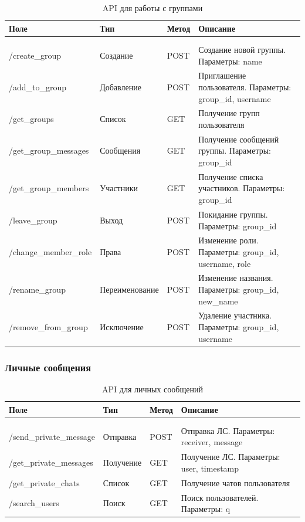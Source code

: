 \begin{xltabular}{\textwidth}{|l|l|p{1.7cm}|X|}
	\caption{API для работы с группами}\label{tab:groups_api} \\ \hline
	\centrow Поле & \centrow Тип & \centrow Метод & \centrow Описание \\ \hline
	 &  &  &  \\ \hline
	\endfirsthead
	 &  &  &  \\ \hline
	\finishhead
	/create\_group & Создание & POST & Создание новой группы. Параметры: name \\ \hline 
	/add\_to\_group & Добавление & POST & Приглашение пользователя. Параметры: group\_id, username \\ \hline 
	/get\_groups & Список & GET & Получение групп пользователя \\ \hline 
	/get\_group\_messages & Сообщения & GET & Получение сообщений группы. Параметры: group\_id \\ \hline 
	/get\_group\_members & Участники & GET & Получение списка участников. Параметры: group\_id \\ \hline 
	/leave\_group & Выход & POST & Покидание группы. Параметры: group\_id \\ \hline 
	/change\_member\_role & Права & POST & Изменение роли. Параметры: group\_id, username, role \\ \hline 
	/rename\_group & Переименование & POST & Изменение названия. Параметры: group\_id, new\_name \\ \hline 
	/remove\_from\_group & Исключение & POST & Удаление участника. Параметры: group\_id, username \\ \hline 
		 	 \end{xltabular}

\subsubsection{Личные сообщения}

\begin{xltabular}{\textwidth}{|l|l|p{1.7cm}|X|}
	\caption{API для личных сообщений}\label{tab:private_api} \\ \hline
	\centrow Поле & \centrow Тип & \centrow Метод & \centrow Описание \\ \hline
	 &  &  &  \\ \hline
	\endfirsthead
	 &  &  &  \\ \hline
	\finishhead
	/send\_private\_message & Отправка & POST & Отправка ЛС. Параметры: receiver, message \\ \hline 
	/get\_private\_messages & Получение & GET & Получение ЛС. Параметры: user, timestamp \\ \hline 
	/get\_private\_chats & Список & GET & Получение чатов пользователя \\ \hline 
	/search\_users & Поиск & GET & Поиск пользователей. Параметры: q \\ \hline 
\end{xltabular}

